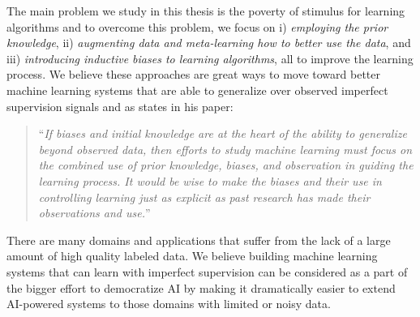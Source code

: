 \medskip

The main problem we study in this thesis is the poverty of stimulus for learning algorithms and to overcome this problem, we focus on  i) \emph{employing the prior knowledge}, ii) \emph{augmenting data and meta-learning how to better use the data}, and iii) \emph{introducing inductive biases to learning algorithms}, all to improve the learning process. We believe these approaches are great ways to move toward better machine learning systems that are able to generalize over observed imperfect supervision signals and as \citet{Mitchell80theneed} states in his paper:
\begin{quote}
``\emph{If biases and initial knowledge are at the heart of the ability to generalize beyond observed data, then efforts to study machine learning must focus on the combined use of prior knowledge, biases, and observation in guiding the learning process. It would be wise to make the biases and their use in controlling learning just as explicit as past research has made their observations and use.}''
\end{quote}
There are many domains and applications that suffer from the lack of a large amount of high quality labeled data. We believe building machine learning systems that can learn with imperfect supervision can be considered as a part of the bigger effort to democratize AI by making it dramatically easier to extend AI-powered systems to those domains with limited or noisy data.


